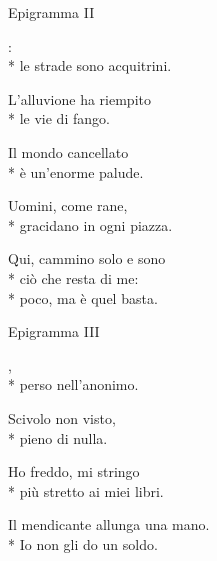 \documentclass[12pt]{book}
\begin{document}
\begin{poem}{Epigramma II}{}

\settowidth{\versewidth}{non meno è ciò che meriti.}

\begin{altverse}
:\\*
le strade sono acquitrini.
\end{altverse}

\begin{altverse}
L'alluvione ha riempito \\*
le vie di fango.
\end{altverse}

\begin{altverse}
Il mondo cancellato \\*
è un'enorme palude. 
\end{altverse}

\begin{altverse}
Uomini, come rane, \\*
gracidano in ogni piazza.
\end{altverse}

\begin{altverse}
Qui, cammino solo e sono \\*
ciò che resta di me: \\*
poco, ma è quel basta.

\end{altverse}

\end{poem}

\begin{poem}{Epigramma III}{}

\settowidth{\versewidth}{non meno è ciò che meriti.}

\begin{altverse}
,\\*
perso nell'anonimo.
\end{altverse}

\begin{altverse}
Scivolo non visto, \\*
pieno di nulla.
\end{altverse}

\begin{altverse}
Ho freddo, mi stringo \\*
più stretto ai miei libri.
\end{altverse}

\begin{altverse}
Il mendicante allunga una mano. \\*
Io non gli do un soldo.
\end{altverse}

\end{poem}
\end{document}
